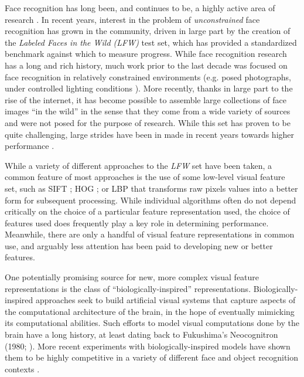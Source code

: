 Face recognition has long been, and continues to be, a highly active area of research \cite{belhumeur2002eigenfaces,yang2002kernel,vasilescu2002multilinear,zhao2003face,he2005face,hua2007face,hua2009robust,guillaumin2009you,hua2009robust,wright2009implicit,zou2007comparative}.
In recent years, interest in the problem of \emph{unconstrained} face
recognition has grown in the community, driven in large part by the creation of
the \emph{Labeled Faces in the Wild (LFW)} \cite{huang:lfw} test set, which has
provided a standardized benchmark against which to measure progress.  While
face recognition research  has a long and rich history, much
work prior to the last decade was focused on face recognition in relatively
constrained environments (e.g. posed photographs, under controlled  lighting
conditions \cite{orl,yale,cvl,ar,phillips2000feret,gross2009multi}).  More
recently, thanks in large part to the rise of the internet, it has become
possible to assemble large collections of face images ``in the wild'' in the
sense that they come from a wide variety of sources and were not posed for the
purpose of research.  While this set has proven to be quite challenging, large
strides have been in made in recent years towards higher performance
\cite{pinto:eccv08,pinto:cvpr09,taigman:bmvc09,wolf:accv09,kumar:iccv09,cao2010face}.

While a variety of different approaches to the \emph{LFW} set have been taken,
a common feature of most approaches is the use of some low-level visual feature
set, such as SIFT \cite{sift,luo2007person}; HOG
\cite{dalal2005hog,albiol2008face}; or LBP
\cite{ahonen2004face,ahonen2006face} that transforms raw pixels values into a
better form for subsequent processing.  While individual algorithms often do
not depend critically on the choice of a particular feature representation
used, the choice of features used does frequently play a key role in
determining performance.  Meanwhile, there are only a handful of visual feature
representations in common use, and arguably less attention has been paid to
developing new or better features.

One potentially promising source for new, more complex visual feature representations is the
class of ``biologically-inspired'' representations.
Biologically-inspired approaches seek to build artificial visual 
systems that capture aspects of the computational architecture of the brain, in the hope of
eventually mimicking its computational abilities. Such efforts to model visual
computations done by the brain have a long history, at least dating back to
Fukushima's Neocognitron (1980; \cite{fukushima1980neocognitron}).  More recent
experiments with biologically-inspired models have shown them to be highly
competitive in a variety of different face and object recognition
contexts \cite{serre2007ror,mutch2008ocr,pinto:plos08,pinto:eccv08,jarrett-iccv-09}.

